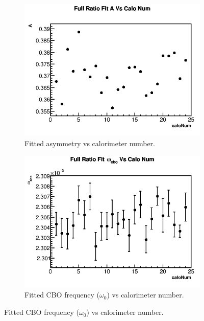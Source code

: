 \begin{figure}[H]
    \vspace{4mm}
    \begin{subfigure}[t]{0.4\textwidth}
	    \centering
		\includegraphics[width=\textwidth]{RatioCBOFit_A_Vs_Calo_Canv}
	    \caption{Fitted asymmetry vs calorimeter number.}
    \end{subfigure}
    \hspace{4mm}
    \begin{subfigure}[t]{0.4\textwidth}
	    \centering
		\includegraphics[width=\textwidth]{RatioCBOFit_omega_cbo_Vs_Calo_Canv}
	    \caption{Fitted CBO frequency ($\omega_{0}$) vs calorimeter number.}
    \end{subfigure}%

\end{figure}
